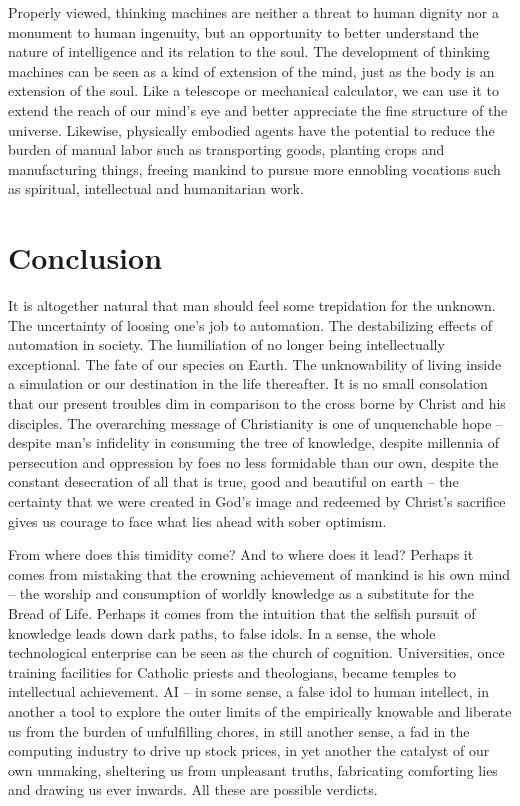 \documentclass[sigplan,nonacm]{acmart}\settopmatter{printfolios=false,printccs=false,printacmref=false}
\begin{document}
Properly viewed, thinking machines are neither a threat to human dignity nor a monument to human ingenuity, but an opportunity to better understand the nature of intelligence and its relation to the soul. The development of thinking machines can be seen as a kind of extension of the mind, just as the body is an extension of the soul. Like a telescope or mechanical calculator, we can use it to extend the reach of our mind's eye and better appreciate the fine structure of the universe. Likewise, physically embodied agents have the potential to reduce the burden of manual labor such as transporting goods, planting crops and manufacturing things, freeing mankind to pursue more ennobling vocations such as spiritual, intellectual and humanitarian work.

\clearpage\section{Conclusion}

It is altogether natural that man should feel some trepidation for the unknown. The uncertainty of loosing one's job to automation. The destabilizing effects of automation in society. The humiliation of no longer being intellectually exceptional. The fate of our species on Earth. The unknowability of living inside a simulation or our destination in the life thereafter. It is no small consolation that our present troubles dim in comparison to the cross borne by Christ and his disciples. The overarching message of Christianity is one of unquenchable hope -- despite man's infidelity in consuming the tree of knowledge, despite millennia of persecution and oppression by foes no less formidable than our own, despite the constant desecration of all that is true, good and beautiful on earth -- the certainty that we were created in God's image and redeemed by Christ's sacrifice gives us courage to face what lies ahead with sober optimism.

From where does this timidity come? And to where does it lead? Perhaps it comes from mistaking that the crowning achievement of mankind is his own mind -- the worship and consumption of worldly knowledge as a substitute for the Bread of Life. Perhaps it comes from the intuition that the selfish pursuit of knowledge leads down dark paths, to false idols. In a sense, the whole technological enterprise can be seen as the church of cognition. Universities, once training facilities for Catholic priests and theologians, became temples to intellectual achievement. AI -- in some sense, a false idol to human intellect, in another a tool to explore the outer limits of the empirically knowable and liberate us from the burden of unfulfilling chores, in still another sense, a fad in the computing industry to drive up stock prices, in yet another the catalyst of our own unmaking, sheltering us from unpleasant truths, fabricating comforting lies and drawing us ever inwards. All these are possible verdicts.
\end{document}
